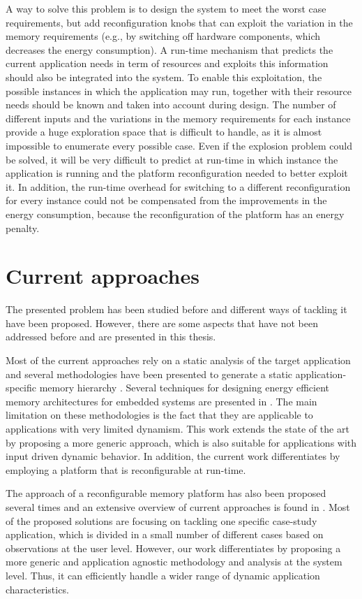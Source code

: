 A way to solve this problem is to design the system to meet the worst case requirements, but add reconfiguration knobs that can exploit the variation in the memory requirements (e.g., by switching off hardware components, which decreases the energy consumption).
A run-time mechanism that predicts the current application needs in term of resources and exploits this information should also be integrated into the system.
To enable this exploitation, the possible instances in which the application may run, together with their resource needs should be known and taken into account during design. 
The number of different inputs and the variations in the memory requirements for each instance provide a huge exploration space that is difficult to handle, as it is almost impossible to enumerate every possible case.
Even if the explosion problem could be solved, it will be very difficult to predict at run-time in which instance the application is running and the platform reconfiguration needed to better exploit it. 
In addition, the run-time overhead for switching to a different reconfiguration for every instance could not be  compensated from the improvements in the energy consumption, because the reconfiguration of the platform has an energy penalty. 

\section{Current approaches}

The presented problem has been studied before and different ways of tackling it have been proposed.
However, there are some aspects that have not been addressed before and are presented in this thesis.

Most of the current approaches rely on a static analysis of the target application and several methodologies have been presented to generate a static application-specific memory hierarchy \cite{Ben00b}.
Several techniques for designing energy efficient memory architectures for embedded systems are presented in \cite{Mac02}. 
The main limitation on these methodologies is the fact that they are applicable to applications with very limited dynamism. 
This work extends the state of the art by proposing a more generic approach, which is also suitable for applications with input driven dynamic behavior.  
In addition, the current work differentiates by employing a platform that is reconfigurable at run-time.
 
The approach of a reconfigurable memory platform has also been proposed several times and an extensive overview of current approaches is found in \cite{Garcia}.
Most of the proposed solutions are focusing on tackling one specific case-study application, which is divided in a small number of different cases based on observations at the user level.
However, our work differentiates by proposing a more generic and application agnostic methodology and analysis at the system level.
Thus, it can efficiently handle a wider range of dynamic application characteristics.

